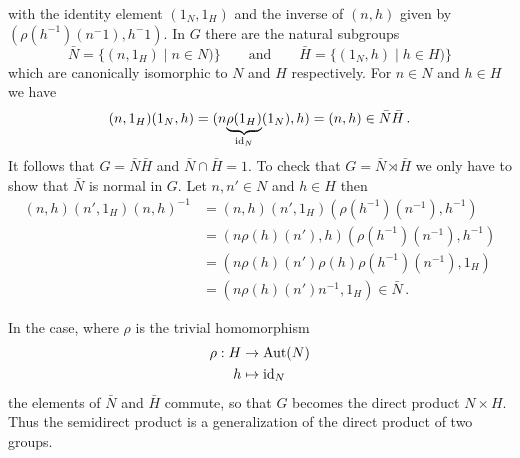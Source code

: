 with the identity element $(1_N,1_H)$ and the inverse of $(n,h)$ given by
$(\rho(h^{-1})(n^-1),h^-1)$. In $G$ there are the natural subgroups
\[
  \bar N=\{(n,1_H)\mid n\in N)\}
  \qquad\text{and}\qquad
  \bar H=\{(1_N,h)\mid h\in H)\}
\]
which are canonically isomorphic to $N$ and $H$ respectively. For $n\in N$ and
$h\in H$ we have
\[
  (n,1_H)(1_N,h)=(n\underset{\operatorname{id}_N}{\underbrace{\rho(1_H)}}(1_N),h)
  =(n,h)\in \bar N\bar H \,.
\]
It follows that $G=\bar N\bar H$ and $\bar N\cap\bar H=1$. To check that
$G=\bar N\rtimes\bar H$ we only have to show that $\bar N$ is normal in $G$.
Let $n,n'\in N$ and $h\in H$ then
\begin{align*}
  (n,h)(n',1_H)(n,h)^{-1}
  &=(n,h)(n',1_H)(\rho(h^{-1})(n^{-1}),h^{-1})
  \\&=(n\rho(h)(n'),h)(\rho(h^{-1})(n^{-1}),h^{-1})
  \\&=(n\rho(h)(n')\rho(h)\rho(h^{-1})(n^{-1}),1_H)
  \\&=(n\rho(h)(n')n^{-1},1_H) \in \bar N \,.
\end{align*}

In the case, where $\rho$ is the trivial homomorphism
\begin{align*}
  \rho:H&\to\operatorname{Aut}(N)
\\h&\mapsto \operatorname{id}_N
\end{align*}
the elements of $\bar N$ and $\bar H$ commute, so that $G$ becomes the direct
product $N\times H$. Thus the semidirect product is a generalization of the
direct product of two groups.


